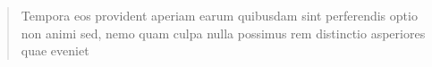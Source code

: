 \documentclass[letterpaper]{article}
\begin{document}
\begin{quote}
\begin{small}

Tempora eos provident aperiam earum quibusdam sint perferendis optio non animi sed, nemo quam culpa nulla possimus rem distinctio asperiores quae eveniet

\end{small}
\end{quote}
\end{document}
